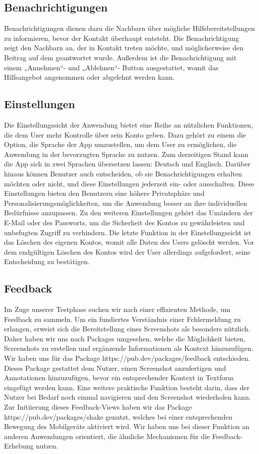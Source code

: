 \subsection{Benachrichtigungen}
Benachrichtigungen dienen dazu die Nachbarn über mögliche Hilfsbereitstellungen zu informieren, bevor der Kontakt überhaupt entsteht. Die Benachrichtigung zeigt den Nachbarn an, der in Kontakt treten möchte, und möglicherweise den Beitrag auf dem geantwortet wurde. Außerdem ist die Benachrichtigung mit einem „Annehmen“- und „Ablehnen“- Button ausgestattet, womit das Hilfsangebot angenommen oder abgelehnt werden kann.

\subsection{Einstellungen}
Die Einstellungssicht der Anwendung bietet eine Reihe an nützlichen Funktionen, die dem User mehr Kontrolle über sein Konto geben.
Dazu gehört zu einem die Option, die Sprache der App umzustellen, um dem User zu ermöglichen, die Anwendung in der bevorzugten Sprache zu nutzen. Zum derzeitigen Stand kann die App sich in zwei Sprachen übersetzen lassen: Deutsch und Englisch.
Darüber hinaus können Benutzer auch entscheiden, ob sie Benachrichtigungen erhalten möchten oder nicht, und diese Einstellungen jederzeit ein- oder ausschalten. Diese Einstellungen bieten den Benutzern eine höhere Privatsphäre und Personalisierungsmöglichkeiten, um die Anwendung besser an ihre individuellen Bedürfnisse anzupassen.
Zu den weiteren Einstellungen gehört das Umändern der E-Mail oder des Passworts, um die Sicherheit des Kontos zu gewährleisten und unbefugten Zugriff zu verhindern.
Die letzte Funktion in der Einstellungssicht ist das Löschen des eigenen Kontos, womit alle Daten des Users gelöscht werden. Vor dem endgültigen Löschen des Kontos wird der User allerdings aufgefordert, seine Entscheidung zu bestätigen.

\subsection{Feedback}
Im Zuge unserer Testphase suchen wir nach einer effizienten Methode, um Feedback zu sammeln. Um ein fundiertes Verständnis einer Fehlermeldung zu erlangen, erweist sich die Bereitstellung eines Screenshots als besonders nützlich. Daher haben wir uns nach Packages umgesehen, welche die Möglichkeit bieten, Screenshots zu erstellen und ergänzende Informationen als Kontext hinzuzufügen. Wir haben uns für das Package https://pub.dev/packages/feedback entschieden. Dieses Package gestattet dem Nutzer, einen Screenshot anzufertigen und Annotationen hinzuzufügen, bevor ein entsprechender Kontext in Textform eingefügt werden kann. Eine weitere praktische Funktion besteht darin, dass der Nutzer bei Bedarf noch einmal navigieren und den Screenshot wiederholen kann. Zur Initiierung dieses Feedback-Views haben wir das Package https://pub.dev/packages/shake genutzt, welches bei einer entsprechenden Bewegung des Mobilgeräts aktiviert wird. Wir haben uns bei dieser Funktion an anderen Anwendungen orientiert, die ähnliche Mechanismen für die Feedback-Erhebung nutzen.

